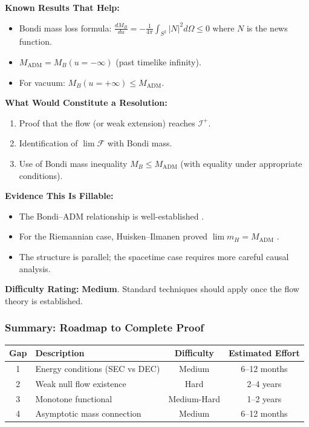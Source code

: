 \textbf{Known Results That Help:}
\begin{itemize}
    \item Bondi mass loss formula: $\frac{dM_B}{du} = -\frac{1}{4\pi}\int_{S^2} |N|^2 d\Omega \leq 0$ where $N$ is the news function.
    \item $M_{\mathrm{ADM}} = M_B(u = -\infty)$ (past timelike infinity).
    \item For vacuum: $M_B(u = +\infty) \leq M_{\mathrm{ADM}}$.
\end{itemize}

\textbf{What Would Constitute a Resolution:}
\begin{enumerate}
    \item Proof that the flow (or weak extension) reaches $\mathscr{I}^+$.
    \item Identification of $\lim \mathcal{F}$ with Bondi mass.
    \item Use of Bondi mass inequality $M_B \leq M_{\mathrm{ADM}}$ (with equality under appropriate conditions).
\end{enumerate}

\textbf{Evidence This Is Fillable:}
\begin{itemize}
    \item The Bondi--ADM relationship is well-established \cite{chruscieldelay2003}.
    \item For the Riemannian case, Huisken--Ilmanen proved $\lim m_H = M_{\mathrm{ADM}}$ \cite{huisken2001}.
    \item The structure is parallel; the spacetime case requires more careful causal analysis.
\end{itemize}

\textbf{Difficulty Rating:} \textbf{Medium}. Standard techniques should apply once the flow theory is established.

\subsubsection{Summary: Roadmap to Complete Proof}

\begin{center}
\begin{tabular}{|c|l|c|c|}
\hline
\textbf{Gap} & \textbf{Description} & \textbf{Difficulty} & \textbf{Estimated Effort} \\
\hline
1 & Energy conditions (SEC vs DEC) & Medium & 6--12 months \\
2 & Weak null flow existence & Hard & 2--4 years \\
3 & Monotone functional & Medium-Hard & 1--2 years \\
4 & Asymptotic mass connection & Medium & 6--12 months \\
\hline
\end{tabular}
\end{center}

